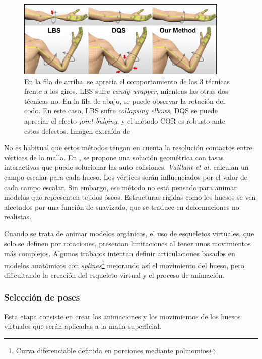 \begin{figure}[h]%
  \centering
  \includegraphics[width=0.90\textwidth]{IMG/corexample.png}
    \caption{En la fila de arriba, se aprecia el comportamiento de las 3 técnicas frente a los giros. \ac{LBS} sufre \emph{candy-wrapper}, mientras las otras dos técnicas no. En la fila de abajo, se puede observar la rotación del codo. En este caso, \ac{LBS} sufre \emph{collapsing elbows}, \ac{DQS} se puede apreciar el efecto \emph{joint-bulging}, y el método \ac{COR} es robusto ante estos defectos. Imagen extraída de \cite{le2016real} }
    \label{fig:corexample}
\end{figure}
%
%
No es habitual que estos métodos tengan en cuenta la resolución contactos entre vértices de la malla. En \cite{Vaillant:2014}, se propone una solución geométrica con tasas interactivas que puede solucionar las auto colisiones. \emph{Vaillant et al.} calculan un campo escalar para cada hueso. Los vértices serán influenciados por el valor de cada campo escalar. Sin embargo, ese método no está pensado para animar modelos que representen tejidos óseos. Estructuras rígidas como los huesos se ven afectados por una función de suavizado, que se traduce en deformaciones no realistas. %

Cuando se trata de animar modelos orgánicos, el uso de esqueletos virtuales, que solo se definen por rotaciones, presentan limitaciones al tener unos movimientos más complejos. Algunos trabajos intentan definir articulaciones basados en modelos anatómicos \cite{joints} con \emph{splines}\footnote{ Curva diferenciable definida en porciones mediante polinomios} mejorando así el movimiento del hueso, pero dificultando la creación del esqueleto virtual y el proceso de animación.

\subsubsection{Selección de poses} 
\label{art:poses}
Esta etapa consiste en crear las animaciones  y los movimientos de los huesos virtuales que serán aplicadas a la malla superficial.   

